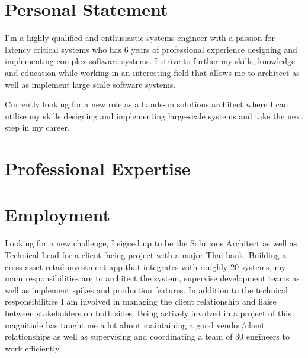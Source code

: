 \documentclass[11pt,a4paper]{my_cv}
\begin{document}
\begin{cvheader}
\end{cvheader}

\section{Personal Statement}
I'm a highly qualified and enthusiastic systems engineer with a passion for latency critical systems who has 6 years of professional experience designing and implementing complex software systems. I strive to further my skills, knowledge and education while working in an interesting field that allows me to architect as well as implement large scale software systems.

Currently looking for a new role as a hands-on solutions architect where I can utilise my skills designing and implementing large-scale systems and take the next step in my career.


\section{Professional Expertise}
\begin{expertise}
\end{expertise}

\section{Employment}
Looking for a new challenge, I signed up to be the Solutions Architect as well as Technical Lead for a client facing project with a major Thai bank. Building a cross asset retail investment app that integrates with roughly 20 systems, my main responsibilities are to architect the system, supervise development teams as well as implement spikes and production features. In addition to the technical responsibilities I am involved in managing the client relationship and liaise between stakeholders on both sides. Being actively involved in a project of this magnitude has taught me a lot about maintaining a good vendor/client relationships as well as supervising and coordinating a team of 30 engineers to work efficiently.
\end{document}
